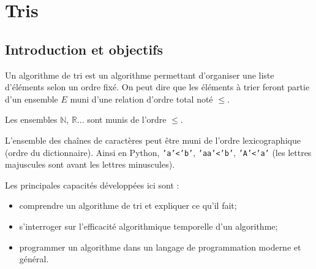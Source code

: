 %
%

\section{Tris}
\subsection{Introduction et objectifs}



\begin{obj}

Un algorithme de tri est un algorithme permettant d'organiser une liste d'éléments selon un ordre fixé.  On peut dire que les éléments à trier feront partie d'un ensemble $E$ muni d'une relation d'ordre total noté $\leq$.

Les ensembles $\mathbb{N}$, $\mathbb{R}$... sont munis de l'ordre $\leq$. 

L'ensemble des chaînes de caractères peut être muni de l'ordre lexicographique (ordre du dictionnaire). Ainsi en Python, \texttt{'a'<'b'}, \texttt{'aa'<'b'}, \texttt{'A'<'a'} (les lettres majuscules sont avant les lettres minuscules).

Les principales capacités développées ici sont :
\begin{itemize}
\item comprendre un algorithme de tri et expliquer ce qu'il fait;
\item s'interroger sur l'efficacité algorithmique temporelle d'un algorithme;
\item programmer un algorithme dans un langage de programmation moderne et général.
\end{itemize}

\end{obj}




